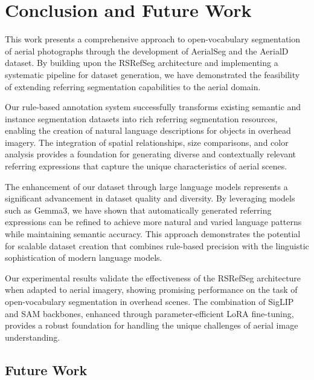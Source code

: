 
\section{Conclusion and Future Work}
\label{sec:conclusion}

This work presents a comprehensive approach to open-vocabulary segmentation of aerial photographs through the development of AerialSeg and the AerialD dataset. By building upon the RSRefSeg architecture and implementing a systematic pipeline for dataset generation, we have demonstrated the feasibility of extending referring segmentation capabilities to the aerial domain.

Our rule-based annotation system successfully transforms existing semantic and instance segmentation datasets into rich referring segmentation resources, enabling the creation of natural language descriptions for objects in overhead imagery. The integration of spatial relationships, size comparisons, and color analysis provides a foundation for generating diverse and contextually relevant referring expressions that capture the unique characteristics of aerial scenes.

The enhancement of our dataset through large language models represents a significant advancement in dataset quality and diversity. By leveraging models such as Gemma3, we have shown that automatically generated referring expressions can be refined to achieve more natural and varied language patterns while maintaining semantic accuracy. This approach demonstrates the potential for scalable dataset creation that combines rule-based precision with the linguistic sophistication of modern language models.

Our experimental results validate the effectiveness of the RSRefSeg architecture when adapted to aerial imagery, showing promising performance on the task of open-vocabulary segmentation in overhead scenes. The combination of SigLIP and SAM backbones, enhanced through parameter-efficient LoRA fine-tuning, provides a robust foundation for handling the unique challenges of aerial image understanding.

\subsection{Future Work}

